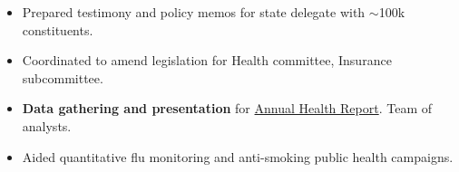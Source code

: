 \documentclass[margin]{res}
\begin{document}
\begin{sloppypar}
\begin{resume}
\begin{itemize}
    \item Prepared testimony and policy memos for state delegate with $\sim$100k constituents. 
    \item Coordinated to amend legislation for Health committee, Insurance subcommittee.
\end{itemize}

\begin{itemize}
    \item \textbf{Data gathering and presentation} for \href{http://www.baltimorehealth.org/hsr2008.html}{Annual Health Report}. Team of analysts.
\item Aided quantitative flu monitoring and anti-smoking public health campaigns.
\end{itemize}


\end{resume}
\end{sloppypar}
\end{document}
